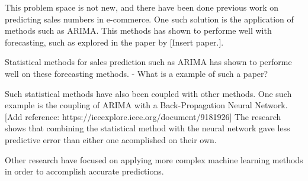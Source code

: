 This problem space is not new, and there have been done previous work on predicting sales numbers in e-commerce.
One such solution is the application of methods such as ARIMA.
This methods has shown to performe well with forecasting, such as explored in the paper by [Insert paper.].














Statistical methods for sales prediction such as ARIMA has shown to performe well on these forecasting methods.
- What is a example of such a paper?

Such statistical methods have also been coupled with other methods.
One such example is the coupling of ARIMA with a Back-Propagation Neural Network.
[Add reference: https://ieeexplore.ieee.org/document/9181926]
The research shows that combining the statistical method with the neural network gave less predictive error than either one acomplished on their own.

Other research have focused on applying more complex machine learning methods in order to accomplish accurate predictions.


















